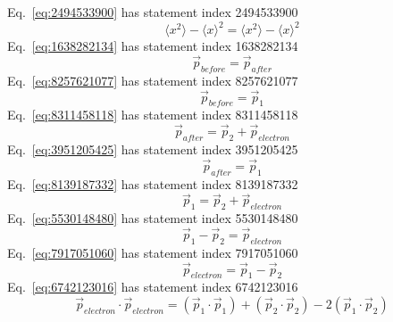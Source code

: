 \documentclass[12pt]{report}
\begin{document}
Eq.~\ref{eq:2494533900} has statement index 2494533900
\begin{equation}
\langle x^2\rangle -\langle x \rangle^2=\langle x^2 \rangle-\langle x \rangle^2
\label{eq:2494533900}
\end{equation}
Eq.~\ref{eq:1638282134} has statement index 1638282134
\begin{equation}
\vec{p}_{before} = \vec{p}_{after}
\label{eq:1638282134}
\end{equation}
Eq.~\ref{eq:8257621077} has statement index 8257621077
\begin{equation}
\vec{p}_{before} = \vec{p}_{1}
\label{eq:8257621077}
\end{equation}
Eq.~\ref{eq:8311458118} has statement index 8311458118
\begin{equation}
\vec{p}_{after} = \vec{p}_{2}+\vec{p}_{electron}
\label{eq:8311458118}
\end{equation}
Eq.~\ref{eq:3951205425} has statement index 3951205425
\begin{equation}
\vec{p}_{after} = \vec{p}_{1}
\label{eq:3951205425}
\end{equation}
Eq.~\ref{eq:8139187332} has statement index 8139187332
\begin{equation}
\vec{p}_{1} = \vec{p}_{2}+\vec{p}_{electron}
\label{eq:8139187332}
\end{equation}
Eq.~\ref{eq:5530148480} has statement index 5530148480
\begin{equation}
\vec{p}_{1}-\vec{p}_{2}=\vec{p}_{electron}
\label{eq:5530148480}
\end{equation}
Eq.~\ref{eq:7917051060} has statement index 7917051060
\begin{equation}
\vec{p}_{electron} = \vec{p}_{1}-\vec{p}_{2}
\label{eq:7917051060}
\end{equation}
Eq.~\ref{eq:6742123016} has statement index 6742123016
\begin{equation}
\vec{p}_{electron}\cdot\vec{p}_{electron} = (\vec{p}_{1}\cdot\vec{p}_{1})+(\vec{p}_{2}\cdot\vec{p}_{2})-2(\vec{p}_{1}\cdot\vec{p}_{2})
\label{eq:6742123016}
\end{equation}
\end{document}
